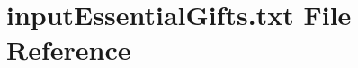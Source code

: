 \hypertarget{inputEssentialGifts_8txt}{}\section{input\+Essential\+Gifts.\+txt File Reference}
\label{inputEssentialGifts_8txt}
